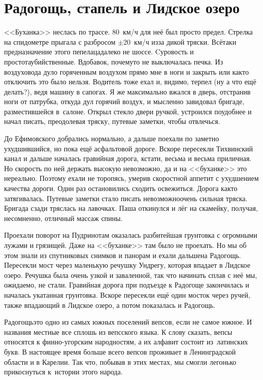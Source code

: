 \chapter{Радогощь, стапель и Лидское озеро} 
\vspace{-1.5cm}
\vepsianrose

<<Буханка>> неслась по трассе. 80~км/ч для неё был просто предел. Стрелка на спидометре прыгала с разбросом $\pm$20~км/ч из\sdash за дикой тряски. Всё\sdash таки предназначение этого пепелаца\mdash далеко не шоссе. Cуровость и простота\mdash убийственные. Вдобавок, почему\sdash то не выключалась печка. Из воздуховода дуло горяченным воздухом прямо мне в ноги и закрыть или как\sdash то отключить это было нельзя. Водитель тоже ехал и, видимо, терпел (ну а что ещё делать?), ведя машину в сапогах. Я же максимально вжался в дверь, отстранив ноги от патрубка, откуда дул горячий воздух, и мысленно завидовал бригаде, разместившейся в~салоне. Открыл стекло двери ручкой, устроился поудобнее и начал писать, преодолевая тряску, путевые заметки, чтобы отвлечься. 

До Ефимовского добрались нормально, а дальше поехали по заметно ухудшившийся, но пока ещё асфальтовой дороге. Вскоре пересекли Тихвинский канал и дальше началась гравийная дорога, кстати, весьма и весьма приличная. Но скорость по ней держать высокую невозможно, да и на <<буханке>> это нереально. Поэтому ехали не торопясь, умерив скоростной аппетит с ухудшением качества дороги. Один раз остановились сходить освежиться. Дорога как\sdash то затягивалась. Путевые заметки стало писать невозможно\mdash очень сильная тряска. Бригада сзади тряслась на лавочках. Паша откинулся и лёг на скамейку, получая, несомненно, отличный массаж спины.

Проехали поворот на Пудрино\mdash там оказалась разбитейшая грунтовка с огромными лужами и грязищей. Даже на <<буханке>> там было не проехать. Но мы об этом знали из спутниковых снимков и панорам и ехали дальше\mdash на Радогощь. Пересекли мост через маленькую речушку Ундрегу, которая впадает в Лидское озеро. Речушка была очень узкой и заваленной, так что начинать сплав с неё мы, ожидаемо, не стали. Гравийная дорога при подъезде к Радогоще закончилась и началась укатанная грунтовка. Вскоре пересекли ещё один мосток через ручей, также впадающий в Лидское озеро, а потом показалась и Радогощь. 

Радогощь\mdash это одно из самых южных поселений вепсов, если не самое южное. И названия местные все сплошь из вепсского языка. К слову сказать, вепсы относятся к финно-угорским народностям, а их алфавит состоит из~латинских букв. В настоящее время больше всего вепсов проживает в Ленинградской области и в Карелии. Так что, побывав в этих местах, мы смогли легонько прикоснуться к~истории этого народа. 

